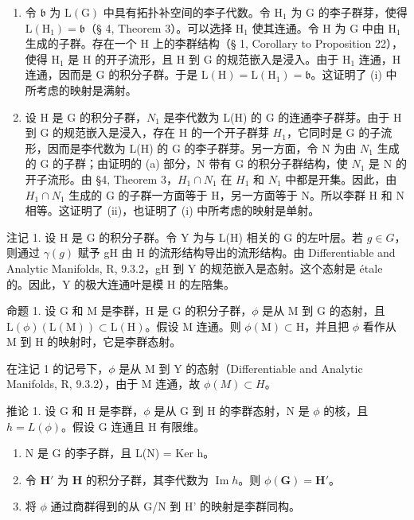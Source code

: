\begin{enumerate}
\def\labelenumi{(\alph{enumi})}
\item
  令 \(\mathfrak{b}\) 为 \(\mathrm{L}(\mathrm{G})\) 中具有拓扑补空间的李子代数。令 \(\mathrm{H}_{1}\) 为 \(\mathrm{G}\) 的李子群芽，使得 \(\mathrm{L}(\mathrm{H}_{1}) = \mathfrak{b}\)（§ 4, Theorem 3）。可以选择 \(\mathrm{H}_{1}\) 使其连通。令 \(\mathrm{H}\) 为 \(\mathrm{G}\) 中由 \(\mathrm{H}_{1}\) 生成的子群。存在一个 \(\mathrm{H}\) 上的李群结构（§ 1, Corollary to Proposition 22），使得 \(\mathrm{H}_{1}\) 是 \(\mathrm{H}\) 的开子流形，且 \(\mathrm{H}\) 到 \(\mathrm{G}\) 的规范嵌入是浸入。由于 \(\mathrm{H}_{1}\) 连通，\(\mathrm{H}\) 连通，因而是 \(\mathrm{G}\) 的积分子群。于是 \(\mathrm{L}(\mathrm{H}) = \mathrm{L}(\mathrm{H}_{1}) = \mathfrak{b}\)。这证明了 (i) 中所考虑的映射是满射。
\item
  设 H 是 G 的积分子群，\(N_{1}\) 是李代数为 L(H) 的 G 的连通李子群芽。由于 H 到 G 的规范嵌入是浸入，存在 H 的一个开子群芽 \(H_{1}\)，它同时是 G 的子流形，因而是李代数为 L(H) 的 G 的李子群芽。另一方面，令 N 为由 \(N_{1}\) 生成的 G 的子群；由证明的 (a) 部分，N 带有 G 的积分子群结构，使 \(N_{1}\) 是 N 的开子流形。由 §4, Theorem 3，\(H_{1} \cap N_{1}\) 在 \(H_{1}\) 和 \(N_{1}\) 中都是开集。因此，由 \(H_{1} \cap N_{1}\) 生成的 G 的子群一方面等于 H，另一方面等于 N。所以李群 H 和 N 相等。这证明了 (ii)，也证明了 (i) 中所考虑的映射是单射。
\end{enumerate}

注记 1. 设 H 是 G 的积分子群。令 Y 为与 L(H) 相关的 G 的左叶层。若 \(g \in G\)，则通过 \(\gamma(g)\) 赋予 gH 由 H 的流形结构导出的流形结构。由 Differentiable and Analytic Manifolds, R, 9.3.2，gH 到 Y 的规范嵌入是态射。这个态射是 étale 的。因此，Y 的极大连通叶是模 H 的左陪集。

命题 1. 设 G 和 M 是李群，H 是 G 的积分子群，\(\phi\) 是从 M 到 G 的态射，且 \(\mathrm{L}(\phi)(\mathrm{L}(\mathrm{M})) \subset \mathrm{L}(\mathrm{H})\)。假设 M 连通。则 \(\phi(\mathrm{M}) \subset \mathrm{H}\)，并且把 \(\phi\) 看作从 M 到 H 的映射时，它是李群态射。

在注记 1 的记号下，\(\phi\) 是从 M 到 Y 的态射（Differentiable and Analytic Manifolds, R, 9.3.2），由于 M 连通，故 \(\phi(M) \subset H\)。

推论 1. 设 G 和 H 是李群，\(\phi\) 是从 G 到 H 的李群态射，N 是 \(\phi\) 的核，且 \(h = L(\phi)\)。假设 G 连通且 H 有限维。

\begin{enumerate}
\def\labelenumi{(\roman{enumi})}
\item
  N 是 G 的李子群，且 L(N) = Ker h。
\item
  令 \(\mathbf{H}'\) 为 \(\mathbf{H}\) 的积分子群，其李代数为 \(\operatorname{Im} h\)。则 \(\phi(\mathbf{G}) = \mathbf{H}'\)。
\item
  将 \(\phi\) 通过商群得到的从 G/N 到 H' 的映射是李群同构。
\end{enumerate}

